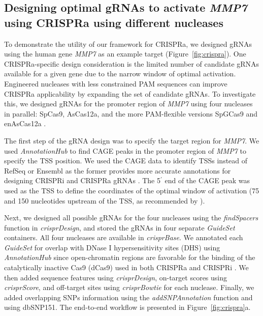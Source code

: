 \documentclass[pdftex,english,10pt]{article}
\newcommand{\fixme}[1]{{\color{red} #1}}
\begin{document}
\subsection{Designing optimal gRNAs to activate \textit{MMP7} using CRISPRa using different nucleases}


To demonstrate the utility of our framework for CRISPRa, we designed gRNAs using the human gene \textit{MMP7} as an example target (Figure~\ref{fig:crispra}). 
One CRISPRa-specific design consideration is the limited number of candidate gRNAs available for a given gene due to the narrow window of optimal activation. 
Engineered nucleases with less constrained PAM sequences can improve CRISPRa applicability by expanding the set of candidate gRNAs. 
To investigate this, we designed gRNAs for the promoter region of \textit{MMP7} using four nucleases in parallel: SpCas9, AsCas12a, and the more PAM-flexible versions SpGCas9 \citep{spg} and enAsCas12a \citep{enpamgb}. 

The first step of the gRNA design was to specify the target region for \textit{MMP7}. 
We used \textit{AnnotationHub} to find CAGE peaks in the promoter region of \textit{MMP7} to specify the TSS position. We used the CAGE data to identify TSSs instead of RefSeq or Ensembl as the former provides more accurate annotations for designing CRISPRi and CRISPRa gRNAs \citep{radzisheuskaya2016optimizing}.
The 5$^\prime$ end of the CAGE peak was used as the TSS to define the coordinates of the optimal window of activation (75 and 150 nucleotides upstream of the TSS, as recommended by \citet{sanson2018optimized}). 

Next, we designed all possible gRNAs for the four nucleases using the \textit{findSpacers} function in \textit{crisprDesign}, and stored the gRNAs in four separate \textit{GuideSet} containers. All four nucleases are available in \textit{crisprBase}. We annotated each \textit{GuideSet} for overlap with DNase I hypersensitivity sites (DHS) using \textit{AnnotationHub} since open-chromatin regions are favorable for the binding of the catalytically inactive Cas9 (dCas9) used in both CRISPRa and CRISPRi \citep{kuscu2014genome,wu2014genome}.
We then added sequence features using \textit{crisprDesign}, on-target scores using \textit{crisprScore}, and off-target sites using \textit{crisprBowtie} for each nuclease. Finally, we added overlapping SNPs information using the \textit{addSNPAnnotation} function and using dbSNP151. The end-to-end workflow is presented in Figure~\ref{fig:crispra}a.
\end{document}
